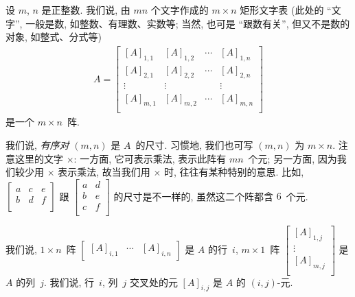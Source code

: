 \begin{definition}[阵]
    设 \(m\), \(n\) 是正整数.
    我们说,
    由 \(mn\) 个文字作成的 \(m \times n\) 矩形文字表
    (此处的 ``文字'', 一般是数,
    如整数、有理数、实数等;
    当然, 也可是 ``跟数有关'', 但又不是数的对象,
    如整式、分式等)
    \begin{align*}
        A =
        \begin{bmatrix}
            [A]_{1,1} & [A]_{1,2} & \cdots & [A]_{1,n} \\
            [A]_{2,1} & [A]_{2,2} & \cdots & [A]_{2,n} \\
            \vdots    & \vdots    & {}     & \vdots    \\
            [A]_{m,1} & [A]_{m,2} & \cdots & [A]_{m,n} \\
        \end{bmatrix}
    \end{align*}
    是一个 \(m \times n\)~阵.

    我们说, \emph{有序对} \((m, n)\) 是 \(A\)~的尺寸.
    习惯地, 我们也可写 \((m, n)\) 为 \(m \times n\).
    注意这里的文字 \(\times\):
    一方面, 它可表示乘法, 表示此阵有 \(mn\)~个元;
    另一方面, 因为我们较少用 \(\times\) 表示乘法,
    故当我们用 \(\times\) 时,
    往往有某种特别的意思.
    比如,
    \(
    \begin{bmatrix}
        a & c & e \\
        b & d & f \\
    \end{bmatrix}
    \)
    跟
    \(
    \begin{bmatrix}
        a & d \\
        b & e \\
        c & f \\
    \end{bmatrix}
    \)
    的尺寸是不一样的,
    虽然这二个阵都含 \(6\)~个元.

    我们说, \(1 \times n\)~阵
    \(
    \begin{bmatrix}
        [A]_{i,1} & \cdots & [A]_{i,n}
    \end{bmatrix}
    \)
    是 \(A\) 的行~\(i\),
    \(m \times 1\)~阵
    \(
    \begin{bmatrix}
        [A]_{1,j} \\
        \vdots    \\
        [A]_{m,j} \\
    \end{bmatrix}
    \)
    是 \(A\) 的列~\(j\).
    我们说,
    行~\(i\), 列~\(j\) 交叉处的元 \([A]_{i,j}\)
    是 \(A\) 的 \((i, j)\)-元.


\end{definition}
